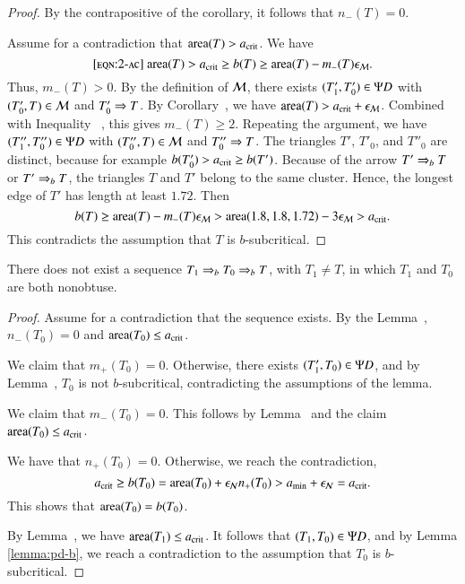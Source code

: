 \begin{proof}  
  By the contrapositive of the corollary, it follows that $n_-(T)=0$.

  Assume for a contradiction that ${\operatorname{area}}(T) > a_\text{crit}$.  We have
\begin{equation}\libel{eqn:2-ac}
\area(T) > \acrit \ge b(T) \ge \area(T) - m_-(T) \epsM.
\end{equation}
Thus, $m_-(T) >0$.  By the definition of $\mathcal M$, there exists
$(T'_1,T'_0)\in\Psi D$ with $(T'_0,T)\in\mathcal M$ and $T'_0\Rightarrow T$.  By
Corollary~, we have ${\operatorname{area}}(T) >
a_\text{crit}+\epsilon_{\mathcal M}$. Combined with Inequality ~, this gives
$m_-(T)\ge 2$.  Repeating the argument, we have $(T''_1,T''_0)\in \Psi D$
with $(T''_0,T)\in \mathcal M$ and $T''_0\Rightarrow T$.  The triangles $T'$, $T'_0$,
and $T''_0$ are distinct, because for example $b(T'_0) > a_\text{crit} \ge
b(T')$.  Because of the arrow $T'\Rightarrow_{b} T$ or $T'\Rightarrow_{b} T$, the triangles
$T$ and $T'$ belong to the same cluster.  Hence, the longest edge of
$T'$ has length at least $1.72$.  Then
\[
b(T) \ge {\operatorname{area}}(T) - m_-(T)\epsilon_{\mathcal M} > {\operatorname{area}}(1.8,1.8,1.72) - 3\epsilon_{\mathcal M} > a_\text{crit}.
\]
This  contradicts the assumption that $T$ is $b$-subcritical.
\end{proof}

\begin{lemma}  There does not exist a
  sequence $T_1\Rightarrow_{b} T_0 \Rightarrow_{b} T$, with $T_1\ne T$, in which $T_1$
  and $T_0$ are both nonobtuse.
\end{lemma}

\begin{proof}  
  Assume for a contradiction that the sequence exists.  By the
  Lemma~, $n_-(T_0)=0$ and ${\operatorname{area}}(T_0)\le a_\text{crit}$.

  We claim that $m_+(T_0)=0$.  Otherwise, there exists
  $(T'_1,T_0)\in\Psi D$, and by Lemma~, $T_0$ is not
  $b$-subcritical, contradicting the assumptions of the lemma.

  We claim that $m_-(T_0)=0$.  This follows by
  Lemma~ and the claim ${\operatorname{area}}(T_0)\le a_\text{crit}$.

We have that $n_+(T_0)=0$.  Otherwise, we reach the contradiction,
\[
a_\text{crit} \ge b(T_0) ={\operatorname{area}}(T_0) + \epsilon_{\mathcal N} n_+(T_0) > a_\text{min} + \epsilon_{\mathcal N} = a_\text{crit}.
\]
This shows that ${\operatorname{area}}(T_0) = b(T_0)$.

By Lemma~, we have ${\operatorname{area}}(T_1)\le a_\text{crit}$.
It follows that $(T_1,T_0)\in\Psi D$, and by Lemma \ref{lemma:pd-b},
we reach a contradiction to the assumption that $T_0$ is $b$-subcritical. 
\end{proof}
  

